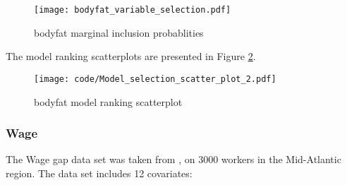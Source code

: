 \documentclass{amsart}[12pt]
\begin{document}
\begin{figure}[p]
	\texttt{[image: bodyfat\_variable\_selection.pdf]}
	\caption{bodyfat marginal inclusion probablities}
	\label{fig:bodyfat_inclusion}
\end{figure}

The model ranking scatterplots are presented in Figure \ref{fig:bodyfat_model_ranking}.

\begin{figure}[p]
	\texttt{[image: code/Model\_selection\_scatter\_plot\_2.pdf]}
	\caption{bodyfat model ranking scatterplot}
	\label{fig:bodyfat_model_ranking}
\end{figure}

\subsubsection{Wage}

The Wage gap data set was taken from \cite{James:2014:ISL:2517747}, on 3000 workers in the Mid-Atlantic
region. The data set includes 12 covariates:
\end{document}
